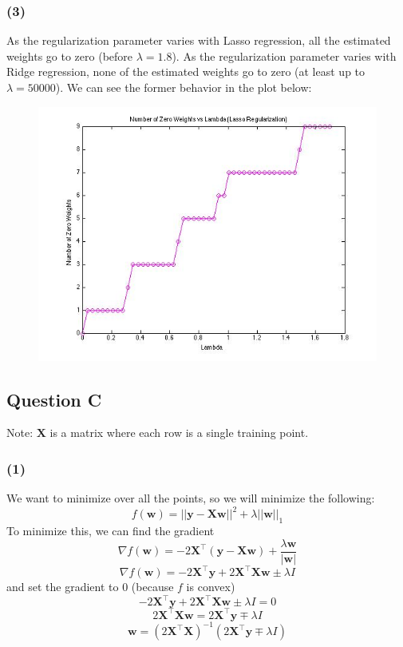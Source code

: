 \documentclass{article}
\newcommand*{\wb}{\ensuremath{\mathbf{w}}}
\newcommand*{\yb}{\ensuremath{\mathbf{y}}}
\newcommand*{\Xb}{\ensuremath{\mathbf{X}}}
\begin{document}
\subsubsection*{(3)}
As the regularization parameter varies with Lasso regression, all the
estimated weights go to zero (before $\lambda = 1.8$).
As the regularization parameter varies with
Ridge regression, none of the estimated weights go to zero (at least up to
$\lambda = 50000$).
We can see the former behavior in the plot below:
\begin{figure}[h]
\includegraphics[width=15cm]{zeros}
\centering
\end{figure}

\subsection*{Question C}
Note: $\Xb$ is a matrix where each row is a single training point.
\subsubsection*{(1)}
We want to minimize over all the points, so we will minimize the following:
\[ f(\wb) = ||\yb - \Xb \wb||^2 + \lambda ||\wb||_1 \]
To minimize this, we can find the gradient
\[ \nabla f(\wb) = -2 \Xb^{\intercal}(\yb - \Xb \wb)
    + \frac{\lambda \wb}{|\wb|} \]
\[ \nabla f(\wb) = -2 \Xb^{\intercal}\yb + 2 \Xb^{\intercal} \Xb \wb
    \pm \lambda I \]
and set the gradient to $0$ (because $f$ is convex)
\[ -2 \Xb^{\intercal}\yb + 2 \Xb^{\intercal} \Xb \wb
    \pm \lambda I = 0 \]
\[ 2 \Xb^{\intercal} \Xb \wb = 2 \Xb^{\intercal}\yb \mp \lambda I \]
\[ \wb = (2 \Xb^{\intercal} \Xb)^{-1} (2 \Xb^{\intercal}\yb \mp \lambda I) \]
\end{document}
